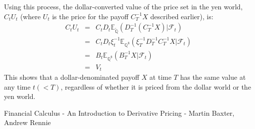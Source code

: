 \documentclass[uplatex,a4j,12pt,dvipdfmx]{jsarticle}
\begin{document}
${}$

Using this process, the dollar-converted value of the price set in the yen world, $C_{t} U_{t}$ (where $U_{t}$ is the price for the payoff $C^{-1}_{T} X$ described earlier), is:
%
%
\begin{eqnarray*}
	C_{t} U_{t}
	&=&
	C_{t}
	D_{t}
	\mathbb{E}_{\tilde{\mathbb{Q}}}
	( D^{-1}_{T} ( C^{-1}_{T} X ) | \mathcal{F}_{t} )
	\\ &=&
	C_{t} D_{t} \xi^{-1}_{t}
	\mathbb{E}_{\mathbb{Q}^{\$}}
	( \xi^{-1}_{T} D^{-1}_{T}  C^{-1}_{T} X | \mathcal{F}_{t} )
	\\ &=&
	B_{t}
	\mathbb{E}_{\mathbb{Q}^{\$}}
	( B^{-1}_{T} X | \mathcal{F}_{t} )
	\\ &=&
	V_{t}
\end{eqnarray*}
%
%
This shows that a dollar-denominated payoff $X$ at time $T$ has the same value at any time $t(<T)$, regardless of whether it is priced from the dollar world or the yen world.
\begin{thebibliography}{9}
	Financial Calculus - An Introduction to Derivative Pricing - Martin Baxter, Andrew Rennie
\end{thebibliography}
\end{document}
